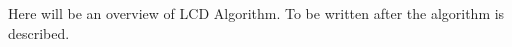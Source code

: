 %
%

Here will be an overview of LCD Algorithm. To be written after the algorithm is described.




